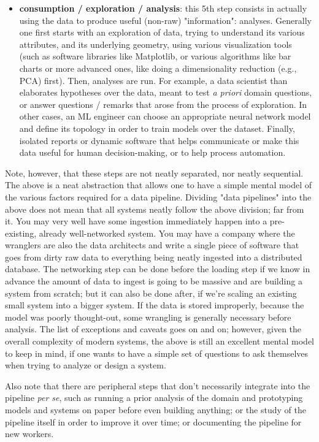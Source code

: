 \documentclass{article}
\begin{document}
\begin{itemize}
\begin{itemize}
		\item \textbf{consumption / exploration / analysis}: this 5th step consists in actually using the data to produce useful (non-raw) "information": analyses. Generally one first starts with an exploration of data, trying to understand its various attributes, and its underlying geometry, using various visualization tools (such as software libraries like Matplotlib, or various algorithms like bar charts or more advanced ones, like doing a dimensionality reduction (e.g., PCA) first). Then, analyses are run. For example, a data scientist than elaborates hypotheses over the data, meant to test \textit{a priori} domain questions, or answer questions / remarks that arose from the process of exploration. In other cases, an ML engineer can choose an appropriate neural network model and define its topology in order to train models over the dataset. Finally, isolated reports or dynamic software that helps communicate or make this data useful for human decision-making, or to help process automation.
	\end{itemize}

	Note, however, that these steps are not neatly separated, nor neatly sequential. The above is a neat abstraction that allows one to have a simple mental model of the various factors required for a data pipeline. Dividing "data pipelines" into the above does not mean that all systems neatly follow the above division; far from it. You may very well have some ingestion immediately happen into a pre-existing, already well-networked system. You may have a company where the wranglers are also the data architects and write a single piece of software that goes from dirty raw data to everything being neatly ingested into a distributed database. The networking step can be done before the loading step if we know in advance the amount of data to ingest is going to be massive and are building a system from scratch; but it can also be done after, if we're scaling an existing small system into a bigger system. If the data is stored improperly, because the model was poorly thought-out, some wrangling is generally necessary before analysis. The list of exceptions and caveats goes on and on; however, given the overall complexity of modern systems, the above is still an excellent mental model to keep in mind, if one wants to have a simple set of questions to ask themselves when trying to analyze or design a system.

	Also note that there are peripheral steps that don't necessarily integrate into the pipeline \textit{per se}, such as running a prior analysis of the domain and prototyping models and systems on paper before even building anything; or the study of the pipeline itself in order to improve it over time; or documenting the pipeline for new workers.

\end{itemize}
\end{document}
